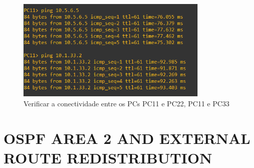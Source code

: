 \documentclass[11pt,english, openright, oneside]{book}
\begin{document}
\begin{figure}[H]
    \centering
    \includegraphics[width=0.82\textwidth]{imagens/Tarefa3/16.ping_PC11_PC22_PC33.png}
    \caption{Verificar a conectividade entre os PCs PC11 e PC22, PC11 e PC33}
    \label{fig:config29}
\end{figure} 
\pagebreak

\section{OSPF AREA 2 AND EXTERNAL ROUTE REDISTRIBUTION}
\vspace{0.2cm}

\mainmatter
\end{document}
